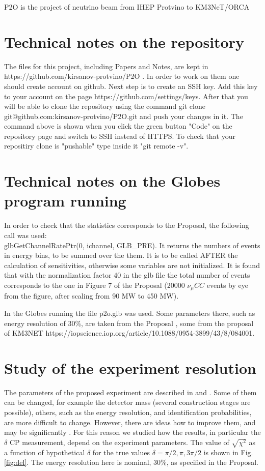 \documentclass[prd,showpacs,groupedaddress,superscriptaddress,amsmath,amssymb]{revtex4-2} %
\begin{document}
 P2O is the project \cite{Akindinov:2019flp} of neutrino beam from IHEP Protvino to KM3NeT/ORCA \cite{KM3NET}


\section{Technical notes on the repository}


 The files for this project, including Papers and Notes, are kept in https://github.com/kirsanov-protvino/P2O . In order to work
on them one should create account on github. Next step is to create an SSH key. Add this key to your account on the page https://github.com/settings/keys.
After that you will be able to clone the repository using the command git clone git@github.com:kirsanov-protvino/P2O.git and push your changes in it.
The command above is shown when you click the green button "Code" on the repository page and switch to SSH instead of HTTPS.
To check that your repositiry clone is "pushable" type inside it "git remote -v".


\section{Technical notes on the Globes program running}


 In order to check that the statistics corresponds to the Proposal, the following call was used: \\
glbGetChannelRatePtr(0, ichannel, GLB\_PRE).
It returns the numbers of events in energy bins, to be summed over the them. It is to be called AFTER the calculation of sensitivities,
otherwise some variables are not initialized. It is found that with the normalization factor 40 in the glb file the total number of
events corresponds to the one in Figure 7 of the Proposal \cite{Akindinov:2019flp} (20000 $\nu_{\mu}CC$ events by eye from the figure,
after scaling from 90 MW to 450 MW).

 In the Globes running the file p2o.glb was used. Some parameters there, such as energy resolution of 30\%, are taken from the
Proposal \cite{Akindinov:2019flp}, some from the proposal of KM3NET https://iopscience.iop.org/article/10.1088/0954-3899/43/8/084001.


\section{Study of the experiment resolution}


 The parameters of the proposed experiment are described in \cite{Akindinov:2019flp} and \cite{KM3NET}. Some of them can be changed,
for example the detector mass (several construction stages are possible), others, such as the energy resolution, and identification probabilities,
are more difficult to change. However, there are ideas how to improve them, and may be significantly \cite{Perrin_Terrin_2022}.
For this reason we studied how the results, in particular the $\delta$ CP measurement, depend on the experiment parameters.
 The value of $\sqrt{\chi^2}$ as a function of hypothetical $\delta$ for the true values $\delta = \pi/2, \pi, 3\pi/2$ is shown
in Fig. \ref{fig:del}. The energy resolution here is nominal, 30\%, as specified in the Proposal.
\end{document}
